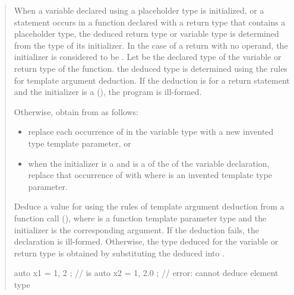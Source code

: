 \begin{quote}
\setcounter{Paras}{6}
\pnum
When a variable declared using a placeholder type is initialized, or a 
 statement occurs in a function declared with a return type 
that contains a placeholder type, the deduced return type or variable type 
is determined from the type of its initializer.
%
In the case of a return with no operand, the initializer is considered to 
be .
%
Let  be the declared type of the variable or return type of the 
function.
%
the deduced type is determined using the rules for template argument
deduction. 
%
If the deduction is for a return statement and the initializer is a 
 (), the program is
ill-formed. 
%

\begin{addedblock}
Otherwise, obtain  from  as follows:
\begin{itemize}
\item replace each occurrence of  in the
variable type with a new invented type template parameter,
or
\item when the initializer is a 
and  is a  of the 
 of the variable declaration, replace that 
occurrence of  with 
where  is an invented template type parameter.
\end{itemize}
\end{addedblock}
% 
Deduce a value for   using the rules of template argument deduction from 
a function call (), where  is a function 
template parameter type and the initializer is the corresponding argument.
%
If the deduction fails, the declaration is ill-formed. 
% 
Otherwise, the type deduced for the variable or return type is obtained by 
substituting the deduced   into .
% 
\enterexample
\begin{codeblock}
auto x1 = { 1, 2 };                 //   is 
auto x2 = { 1, 2.0 };               // error: cannot deduce element type
\end{codeblock}
\exitexample
\end{quote}

